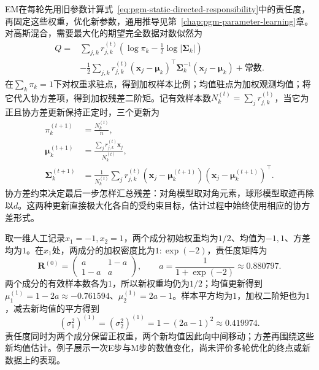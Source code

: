 EM在每轮先用旧参数计算式~\eqref{eq:pgm-static-directed-responsibility}中的责任度，再固定这些权重，优化新参数，通用推导见第~\ref{chap:pgm-parameter-learning}章。对高斯混合，需要最大化的期望完全数据对数似然为
\[
  \begin{aligned}
    Q={}&\sum_{j,k}r_{j,k}^{(t)}
       \left(\log\pi_k-\frac12\log|\bm{\Sigma}_k|\right)\\
       &-\frac12\sum_{j,k}r_{j,k}^{(t)}
         (\bm{x}_j-\bm{\mu}_k)^\top
          \bm{\Sigma}_k^{-1}(\bm{x}_j-\bm{\mu}_k)
       +\text{常数}.
  \end{aligned}
\]
在$\sum_k\pi_k=1$下对权重求驻点，得到加权样本比例；均值驻点为加权观测均值；将它代入协方差项，得到加权残差二阶矩。记有效样本数$N_k^{(t)}=\sum_jr_{j,k}^{(t)}$，当它为正且协方差更新保持正定时，三个更新为
\begin{equation}
  \label{eq:pgm-static-directed-gmm-em}
  \begin{aligned}
    \pi_k^{(t+1)}&=\frac{N_k^{(t)}}{n},\\
    \bm{\mu}_k^{(t+1)}
      &=\frac{\sum_jr_{j,k}^{(t)}\bm{x}_j}{N_k^{(t)}},\\
    \bm{\Sigma}_k^{(t+1)}
      &=\frac{1}{N_k^{(t)}}\sum_jr_{j,k}^{(t)}
       (\bm{x}_j-\bm{\mu}_k^{(t+1)})
       (\bm{x}_j-\bm{\mu}_k^{(t+1)})^\top.
  \end{aligned}
\end{equation}
协方差约束决定最后一步怎样汇总残差：对角模型取对角元素，球形模型取迹再除以$d$。这两种更新直接极大化各自的受约束目标，估计过程中始终使用相应的协方差形式。

\begin{example}[一轮可复核的高斯混合EM]
  \label{ex:pgm-static-directed-gmm-em}
  取一维人工记录$x_1=-1,x_2=1$，两个成分初始权重均为$1/2$、均值为$-1,1$、方差均为$1$。在$x_1$处，两成分的加权密度比为$1:\exp(-2)$，责任度矩阵为
  \[
    \bm{R}^{(0)}
      =\begin{pmatrix}a&1-a\\1-a&a\end{pmatrix},
    \qquad a=\frac{1}{1+\exp(-2)}\approx0.880797.
  \]
  两个成分的有效样本数各为$1$，所以新权重均仍为$1/2$；均值更新得到$\mu_1^{(1)}=1-2a\approx-0.761594$、$\mu_2^{(1)}=2a-1$。样本平方均为$1$，加权二阶矩也为$1$，减去新均值的平方得到
  \[
    (\sigma_1^2)^{(1)}=(\sigma_2^2)^{(1)}
      =1-(2a-1)^2\approx0.419974.
  \]
  责任度同时为两个成分保留正权重，两个新均值因此向中间移动；方差再围绕这些新均值估计。例子展示一次E步与M步的数值变化，尚未评价多轮优化的终点或新数据上的表现。
\end{example}

